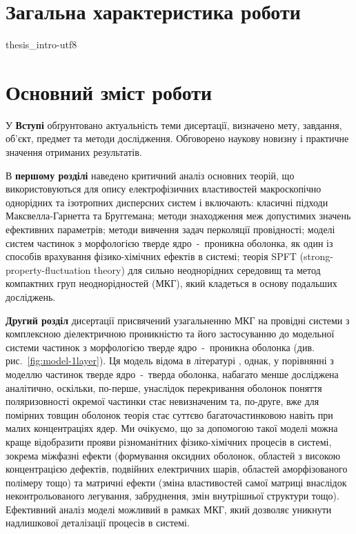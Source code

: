 \documentclass[twoside,a4paper,14pt]{vakaref-utf8}
\begin{document}
\part{Загальна характеристика роботи}
{thesis_intro-utf8}

\part{Основний зміст роботи}

У {\bf Вступі} обґрунтовано актуальність теми дисертації, 
визначено мету, завдання, об'єкт, предмет та методи 
дослідження. Обговорено наукову новизну і практичне
значення отриманих результатів.

В {\bf першому розділі} наведено критичний аналіз основних теорій, що використовуються для опису електрофізичних властивостей макроскопічно однорідних та ізотропних дисперсних систем і включають: класичні підходи Макс\-велла-Гарнетта та Бруггемана; 
методи знаходження меж допустимих значень ефективних параметрів;
методи вивчення задач перколяції провідності;
моделі систем частинок з морфологією тверде ядро~-~проникна оболонка, як один із способів врахування фізико-хімічних ефектів в системі;
теорія SPFT (strong-property-fluctuation theory) для сильно неоднорідних середовищ та метод компактних груп неоднорідностей (МКГ), який кладеться в основу подальших досліджень.

{\bf Другий розділ} дисертації присвячений узагальненню МКГ \cite{Sushko2007, Sushko2009, SushkoJPD2009, Sushko2017} на провідні системи з комплексною діелектричною проникністю та його застосуванню до модельної системи частинок з морфологією тверде ядро~-~проникна оболонка (див. рис.~\ref{fig:model-1layer}). 
Ця модель відома в літературі \cite{Torquato}, однак, у порівнянні з моделлю частинок тверде ядро~-~тверда оболонка, набагато менше досліджена аналітично, оскільки, по-перше, унаслідок перекривання оболонок поняття поляризовності окремої частинки стає невизначеним та, по-друге, вже для помірних товщин оболонок теорія стає суттєво багаточастинковою навіть при малих концентраціях ядер. Ми очікуємо, що за допомогою такої моделі можна краще відобразити прояви різноманітних фізико-хімічних процесів в системі, зокрема міжфазні ефекти (формування оксидних оболонок, областей з високою концентрацією дефектів, подвійних електричних шарів, областей аморфізованого полімеру тощо) та матричні ефекти (зміна властивостей самої матриці внаслідок неконтрольованого легування, забруднення, змін внутрішньої структури тощо). Ефективний аналіз моделі можливий в рамках МКГ, який дозволяє уникнути надлишкової деталізації процесів в системі.
\end{document}
